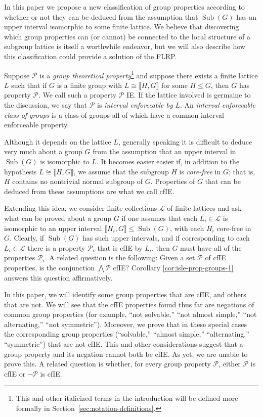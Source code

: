 \documentclass{gen-j-l}
\newcommand{\lb}{\ensuremath{\llbracket}}
\newcommand{\rb}{\ensuremath{\rrbracket}}
\newcommand{\<}{\ensuremath{\langle}}
\renewcommand{\>}{\ensuremath{\rangle}}
\theoremstyle{plain}
\theoremstyle{definition}
\theoremstyle{remark}
\numberwithin{theorem}{section}
\numberwithin{claim}{section}
\numberwithin{equation}{section}
\numberwithin{conjecture}{section}
\newcommand{\defn}[1]{\emph{#1}}
\renewcommand{\leq}{\ensuremath{\leqslant}}
\newcommand{\Meet}{\ensuremath{\bigwedge}}
\newcommand{\Sub}{\ensuremath{\operatorname{Sub}}}
\newcommand{\2}{\ensuremath{\mathbf{2}}}
\newcommand{\3}{\ensuremath{\mathbf{3}}}
\newcommand{\sL}{\ensuremath{\mathscr{L}}}
\newcommand{\sP}{\ensuremath{\mathscr{P}}}
\newcommand{\cP}{\ensuremath{\mathcal{P}}}
\begin{document}
In this paper we propose a new classification of group properties according to
whether or not they can be deduced from the assumption that $\Sub(G)$ has an upper
interval isomorphic to some finite lattice.  We believe that discovering which 
group properties can (or cannot) be connected to the local structure
of a subgroup lattice is itself a worthwhile endeavor, but we will also describe 
how this classification could provide a solution of the \acs{FLRP}.  

Suppose $\cP$ is a \emph{group theoretical property}\footnote{This and other
  italicized terms in the introduction will be defined more formally in
  Section~\ref{sec:notation-definitions}.}  
and suppose there exists a finite lattice $L$ such that if $G$ is a finite group
with $L \cong \lb H,G \rb$ for some $H\leq G$, then $G$ has property $\cP$.  We call
such a property $\cP$ \ac{IE}.  If the lattice involved is germaine to the
discussion, we say that $\cP$ is  \emph{interval enforceable by} $L$.
An \defn{interval enforceable class of groups} is a class of groups all of which
have a common interval enforceable property.

Although it depends on the lattice $L$, generally speaking it is difficult to 
deduce very much about a group $G$ from the assumption that an upper interval
in $\Sub(G)$ is isomorphic to $L$.  It becomes easier easier if, in addition to the
hypothesis $L\cong\lb H,G \rb$, we assume that the subgroup $H$ is
\emph{core-free} in $G$; that is, $H$ contains no nontrivial normal subgroup of
$G$.  Properties of $G$ that can be deduced from these assumptions are what we
call \ac{cfIE}. 

Extending this idea, we consider finite collections $\sL$ of finite lattices
and ask what can be proved about a group $G$ if one assumes that each 
$L_i\in \sL$ is isomorphic to an upper interval $\lb H_i, G \rb\leq \Sub(G)$, with
each $H_i$ core-free in $G$.  Clearly, if $\Sub(G)$ has such upper intervals,
and if corresponding to each $L_i\in \sL$ there is a property
$\cP_i$ that is \ac{cfIE} by $L_i$, then $G$ must have all of the properties
$\cP_i$. A related question is the following: Given a set $\sP$ of
\ac{cfIE} properties, is the conjunction $\Meet \sP$ \ac{cfIE}?  
Corollary \ref{cor:isle-prop-groups-1} answers this question affirmatively. 

In this paper, we will identify some group properties that are \ac{cfIE}, and
others that are not. We will see that the \ac{cfIE} properties
found thus far are negations of common group properties (for
example, ``not solvable,'' ``not almost simple,'' ``not alternating,'' ``not
symmetric'').  Moreover, we prove that in these special cases the
corresponding group properties (``solvable,'' ``almost simple,''
``alternating,''  ``symmetric'') that are not \ac{cfIE}.  This and
other considerations suggest that a group property and its
negation cannot both be \ac{cfIE}.  As yet, we are unable to prove this.
A related question is whether, for every group property
$\cP$, either $\cP$ is \ac{cfIE} or $\neg \cP$ is \ac{cfIE}. 
\end{document}
